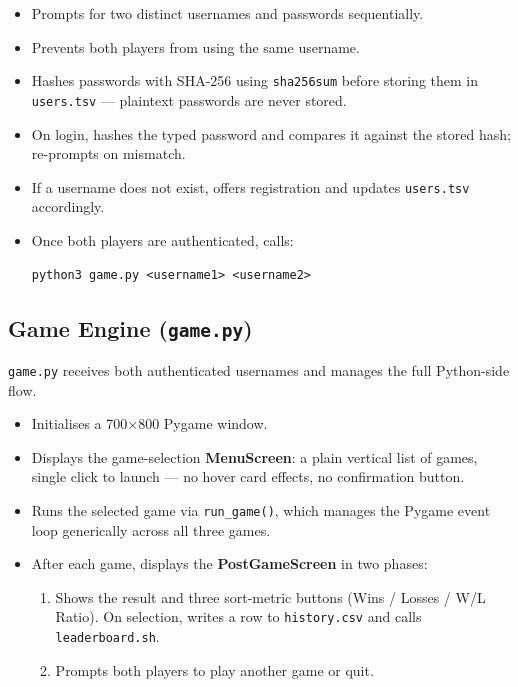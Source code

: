 \documentclass[12pt, letterpaper]{article}
\begin{document}
\begin{itemize}
    \item Prompts for two distinct usernames and passwords sequentially.
    \item Prevents both players from using the same username.
    \item Hashes passwords with SHA-256 using \texttt{sha256sum} before storing
          them in \texttt{users.tsv} --- plaintext passwords are never stored.
    \item On login, hashes the typed password and compares it against the
          stored hash; re-prompts on mismatch.
    \item If a username does not exist, offers registration and updates
          \texttt{users.tsv} accordingly.
    \item Once both players are authenticated, calls:
\begin{lstlisting}[style=bashstyle]
python3 game.py <username1> <username2>
\end{lstlisting}
\end{itemize}

\subsection{Game Engine (\texttt{game.py})}

\texttt{game.py} receives both authenticated usernames and manages the full
Python-side flow.

\begin{itemize}
    \item Initialises a 700$\times$800 Pygame window.
    \item Displays the game-selection \textbf{MenuScreen}: a plain vertical
          list of games, single click to launch --- no hover card effects, no
          confirmation button.
    \item Runs the selected game via \texttt{run\_game()}, which manages the
          Pygame event loop generically across all three games.
    \item After each game, displays the \textbf{PostGameScreen} in two phases:
          \begin{enumerate}
              \item Shows the result and three sort-metric buttons
                    (Wins / Losses / W/L Ratio). On selection, writes a row to
                    \texttt{history.csv} and calls \texttt{leaderboard.sh}.
              \item Prompts both players to play another game or quit.
          \end{enumerate}
\end{itemize}
\end{document}
